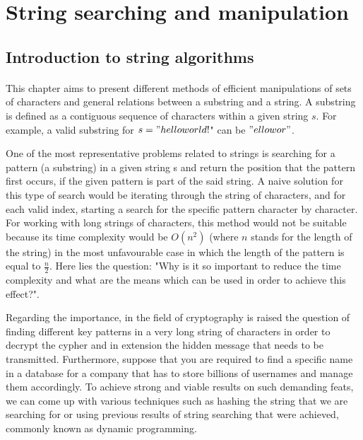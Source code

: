 \documentclass[letterpaper]{article}
\begin{document}
\newpage



\section{String searching and manipulation}



\subsection{Introduction to string algorithms}

\paragraph{}

This chapter aims to present different methods of efficient manipulations of sets of characters and general relations between a substring and a string. A substring is defined as a contiguous sequence of characters within a given string $s$. For example, a valid substring for $s = "hello world!$" can be $"ello wor"$.

One of the most representative problems related to strings is searching for a pattern (a substring) in a given string s and return the position that the pattern first occurs, if the given pattern is part of the said string. A naive solution for this type of search would be iterating through the string of characters, and for each valid index, starting a search for the specific pattern character by character. For working with long strings of characters, this method would not be suitable because its time complexity would be $O(n^{2})$ (where $n$ stands for the length of the string) in the most unfavourable case in which the length of the pattern is equal to $\frac{n}{2}$. Here lies the question: "Why is it so important to reduce the time complexity and what are the means which can be used in order to achieve this effect?".

Regarding the importance, in the field of cryptography is raised the question of finding different key patterns in a very long string of characters in order to decrypt the cypher and in extension the hidden message that needs to be transmitted. Furthermore, suppose that you are required to find a specific name in a database for a company that has to store billions of usernames and manage them accordingly. To achieve strong and viable results on such demanding feats, we can come up with various techniques such as hashing the string that we are searching for or using previous results of string searching that were achieved, commonly known as dynamic programming.
\end{document}
